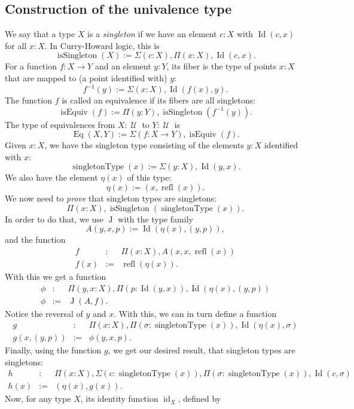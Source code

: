 \documentclass{article}
\newcommand{\Id}{\operatorname{Id}}
\newcommand{\J}{\operatorname{J}}
\newcommand{\refl}{\operatorname{refl}}
\newcommand{\U}{\operatorname{\mathcal{U}}}
\newcommand{\isSingleton}{\operatorname{isSingleton}}
\newcommand{\isEquiv}{\operatorname{isEquiv}}
\newcommand{\Eq}{\operatorname{Eq}}
\newcommand{\singletonType}{\operatorname{singletonType}}
\newcommand{\id}{\operatorname{id}}
\begin{document}
\subsection{Construction of the univalence type}

We say that a type $X$ is a \emph{singleton} if we have an element $c:X$ with
$\Id(c,x)$ for all $x:X$. In Curry-Howard logic, this is
\[
    \isSingleton(X) := \Sigma(c:X), \Pi(x:X), \Id(c,x).
\]
For a function $f:X\to Y$ and an element $y:Y$, its fiber is the type of
points $x:X$ that are mapped to (a point identified with) $y$:
\[
    f^{-1}(y) := \Sigma(x:X),\Id(f(x),y).
\]
The function $f$ is called an equivalence if its fibers are all
singletons:
\[
    \isEquiv(f) := \Pi(y:Y), \isSingleton(f^{-1}(y)).
\]
The type of equivalences from $X:\U$ to $Y:\U$ is
\[
    \Eq(X,Y) := \Sigma(f:X\to Y), \isEquiv(f).
\]
Given $x:X$, we have the singleton type consisting of the elements $y:X$
identified with $x$:
\[
   \singletonType(x) := \Sigma(y:X), \Id(y,x).
\]
We also have the element $\eta(x)$ of this type:
\[
   \eta(x) := (x, \refl(x)).
\]
We now need to \emph{prove} that singleton types are singletons:
\[
   \Pi(x:X), \isSingleton(\singletonType(x)).
\]
In order to do that, we use $\J$ with the type family
\[
   A(y,x,p) := \Id(\eta(x),(y,p)),
\]
and the function 
\begin{eqnarray*}
  f & : & \Pi(x:X), A(x,x,\refl(x)) \\
   f(x) & := & \refl(\eta(x)).
\end{eqnarray*}
With this we get a function
\begin{eqnarray*}
   \phi & : & \Pi(y,x:X), \Pi(p:\Id(y,x)), \Id(\eta(x),(y,p)) \\
   \phi & := & \J(A,f).
\end{eqnarray*}
Notice the reversal of $y$ and $x$.
%
With this, we can in turn define a function
\begin{eqnarray*}
   g & : & \Pi(x:X), \Pi(\sigma :\singletonType(x)), \Id(\eta(x),\sigma ) \\
   g(x,(y,p)) & := & \phi(y,x,p).
\end{eqnarray*}
Finally, using the function $g$, we get our desired result, that
singleton types are singletons:
\begin{eqnarray*}
   h & : & \Pi(x:X), \Sigma(c:\singletonType(x)), \Pi(\sigma :\singletonType(x)), \Id(c,\sigma )\\
   h(x) & := & (\eta(x),g(x)).
\end{eqnarray*}
Now, for any type $X$, its identity function $\id_X$, defined by
\end{document}
